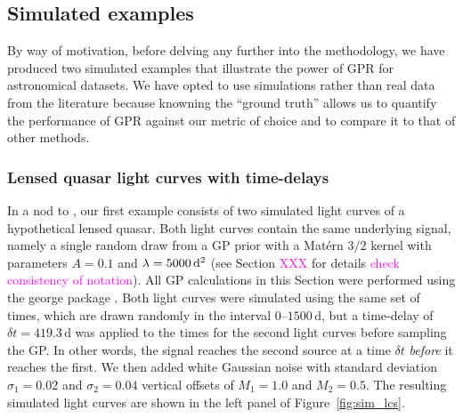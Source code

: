 \documentclass[letterpaper]{ar-1col}
\newcommand{\suz}[1]{\textcolor{magenta}{#1}}
\begin{document}
\subsection{Simulated examples}
\label{sec:sim_examples}

By way of motivation, before delving any further into the methodology, we have produced two simulated examples that illustrate the power of GPR for astronomical datasets. We have opted to use simulations rather than real data from the literature because knowning the ``ground truth'' allows us to quantify the performance of GPR against our metric of choice and to compare it to that of other methods. 

\subsubsection{Lensed quasar light curves with time-delays}
\label{sec:sim_quasar}

In a nod to \citet{prh92a}, our first example consists of two simulated light curves of a hypothetical lensed quasar. Both light curves contain the same underlying signal, namely a single random draw from a GP prior with a Mat{\'e}rn $3/2$ kernel with parameters $A=0.1$ and $\lambda=5000\,{\rm d}^2$ (see Section \suz{XXX} for details \suz{check consistency of notation}). All GP calculations in this Section were performed using the {\sc george} package \citep{george}. Both light curves were simulated using the same set of times, which are drawn randomly in the interval $0$--$1500$\,d, but a time-delay of $\delta t=419.3$\,d was applied to the times for the second light curves before sampling the GP. In other words, the signal reaches the second source at a time $\delta t$ \textit{before} it reaches the first. We then added white Gaussian noise with standard deviation $\sigma_1=0.02$ and $\sigma_2=0.04$ vertical offsets of $M_1=1.0$ and $M_2=0.5$. The resulting simulated light curves are shown in the left panel of Figure~\ref{fig:sim_lcs}.
\end{document}

